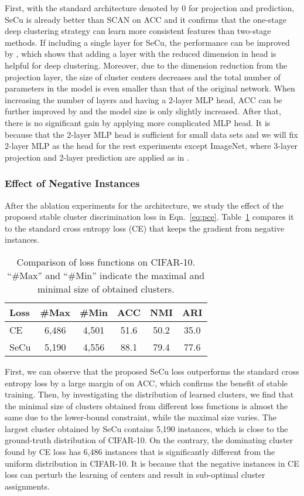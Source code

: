 \documentclass[10pt,twocolumn,letterpaper]{article}
\begin{document}
First, with the standard architecture denoted by 0 for projection and prediction, SeCu is already  better than SCAN on ACC and it confirms that the one-stage deep clustering strategy can learn more consistent features than two-stage methods. If including a single layer for SeCu, the performance can be improved by , which shows that adding a layer with the reduced dimension in head is helpful for deep clustering. Moreover, due to the dimension reduction from the projection layer, the size of cluster centers decreases and the total number of parameters in the model is even smaller than that of the original network. When increasing the number of layers and having a 2-layer MLP head, ACC can be further improved by  and the model size is only slightly increased. After that, there is no significant gain by applying more complicated MLP head. It is because that the 2-layer MLP head is sufficient for small data sets and we will fix 2-layer MLP as the head for the rest experiments except ImageNet, where 3-layer projection and 2-layer prediction are applied as in \cite{coke}. 

\subsubsection{Effect of Negative Instances}
After the ablation experiments for the architecture, we study the effect of the proposed stable cluster discrimination loss in Eqn.~\ref{eq:pce}. Table~\ref{ta:pce} compares it to the standard cross entropy loss (CE) that keeps the gradient from negative instances.

\begin{table}[!ht]
\centering
\begin{tabular}{|l|c|c|c|c|c|}\hline
Loss&\#Max&\#Min&ACC&NMI&ARI\\\hline
CE&6,486&4,501&51.6&50.2&35.0\\
SeCu&5,190&4,556&88.1&79.4&77.6\\\hline
\end{tabular}
\caption{Comparison of loss functions on CIFAR-10. ``\#Max'' and ``\#Min'' indicate the maximal and minimal size of obtained clusters.}\label{ta:pce}
\end{table}

First, we can observe that the proposed SeCu loss outperforms the standard cross entropy loss by a large margin of  on ACC, which confirms the benefit of stable training. Then, by investigating the distribution of learned clusters, we find that the minimal size of clusters obtained from different loss functions is almost the same due to the lower-bound constraint, while the maximal size varies. The largest cluster obtained by SeCu contains 5,190 instances, which is close to the ground-truth distribution of CIFAR-10. On the contrary, the dominating cluster found by CE loss has 6,486 instances that is significantly different from the uniform distribution in CIFAR-10. It is because that the negative instances in CE loss can perturb the learning of centers and result in sub-optimal cluster assignments. 
\end{document}
